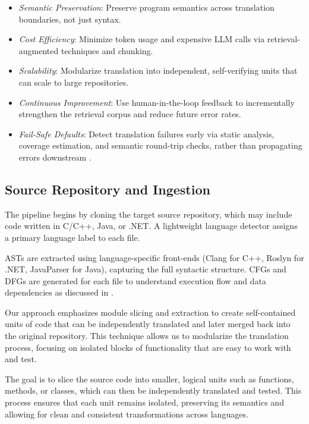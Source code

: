 \documentclass[twocolumn]{article}
\begin{document}
\begin{itemize}
    \item \textit{Semantic Preservation}: Preserve program semantics across translation boundaries, not just syntax.
    \item \textit{Cost Efficiency}: Minimize token usage and expensive LLM calls via retrieval-augmented techniques and chunking.
    \item \textit{Scalability}: Modularize translation into independent, self-verifying units that can scale to large repositories.
    \item \textit{Continuous Improvement}: Use human-in-the-loop feedback to incrementally strengthen the retrieval corpus and reduce future error rates.
    \item \textit{Fail-Safe Defaults}: Detect translation failures early via static analysis, coverage estimation, and semantic round-trip checks, rather than propagating errors downstream \cite{ibrahimzada2024program}.
\end{itemize}

\subsection{Source Repository and Ingestion}

The pipeline begins by cloning the target source repository, which may include code written in C/C++, Java, or .NET. A lightweight language detector assigns a primary language label to each file.

ASTs are extracted using language-specific front-ends (Clang for C++, Roslyn for .NET, JavaParser for Java), capturing the full syntactic structure. CFGs and DFGs are generated for each file to understand execution flow and data dependencies as discussed in \cite{illinois-ir}.

Our approach emphasizes module slicing and extraction to create self-contained units of code that can be independently translated and later merged back into the original repository. This technique allows us to modularize the translation process, focusing on isolated blocks of functionality that are easy to work with and test.

The goal is to slice the source code into smaller, logical units such as functions, methods, or classes, which can then be independently translated and tested. This process ensures that each unit remains isolated, preserving its semantics and allowing for clean and consistent transformations across languages.
\end{document}
